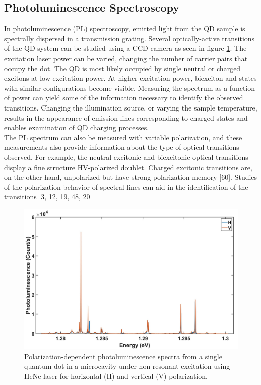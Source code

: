 \subsection{Photoluminescence Spectroscopy}
In photoluminescence (PL) spectroscopy, emitted light from the QD sample is spectrally dispersed in a transmission grating. Several optically-active transitions of the QD system can be studied using a CCD camera  as seen in figure \ref{fig:Spectrum_HV}. The excitation laser power can be varied, changing the number of carrier pairs that occupy the dot. The QD is most likely occupied by single neutral or charged excitons at low excitation power. At higher excitation power, biexciton and states with similar configurations become visible. Measuring the spectrum as a function of power can yield some of the information necessary to identify the observed transitions. Changing the illumination source, or varying the sample temperature, results in the appearance of emission lines corresponding to charged states and enables examination of QD charging processes.\\
The PL spectrum can also be measured with variable polarization, and these measurements also provide information about the type of optical transitions observed. For example, the neutral excitonic and biexcitonic optical transitions display a fine structure HV-polarized doublet. Charged excitonic transitions are, on the other hand, unpolarized but have strong polarization memory [60]. Studies of the polarization behavior of spectral lines can aid in the identification of the transitions [3, 12, 19, 48, 20]
\begin{figure}[H]
		\centering
		\includegraphics[scale=0.27]{figures/Spectrum.jpg}
		\caption{Polarization-dependent photoluminescence spectra from a single quantum dot in a microcavity under non-resonant excitation using HeNe laser for horizontal (H) and vertical (V) polarization.}
		\label{fig:Spectrum_HV}
	\end{figure}
